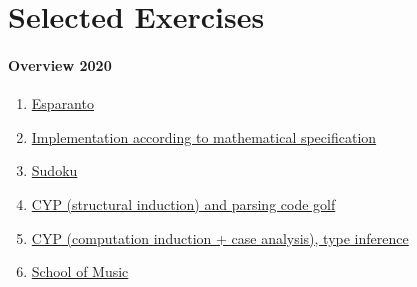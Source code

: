 \section{Selected Exercises}

\paragraph{Overview 2020}
\begin{enumerate}
\item \href{https://www21.in.tum.de/teaching/fpv/WS20/assets/ex01.pdf}{Esparanto}
\item \href{https://www21.in.tum.de/teaching/fpv/WS20/assets/ex02.pdf}{Implementation according to mathematical specification}
\item \href{https://www21.in.tum.de/teaching/fpv/WS20/assets/ex03.pdf}{Sudoku}
\item \href{https://www21.in.tum.de/teaching/fpv/WS20/assets/ex04.pdf}{CYP (structural induction) and parsing code golf}
\item \href{https://www21.in.tum.de/teaching/fpv/WS20/assets/ex05.pdf}{CYP (computation induction + case analysis), type inference}
\item \href{https://www21.in.tum.de/teaching/fpv/WS20/assets/ex06.pdf}{School of Music}
\end{enumerate}
